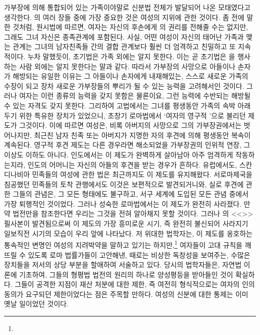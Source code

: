 가부장에 의해 통합되어 있는 가족이야말로
신분법 전체가 발달되어 나온 모태였다고 생각한다.
의 여러 장들 중에
가장 중요한 것은 여성의 지위에 관한 것이다.
좀 전에 말한 것처럼,
원시법에 따르면,
여자는 자신의 후손에게 의 권리를 전해줄 수는 없지만,
그래도 그녀 자신은 종족관계에 포함된다.
사실, 어떤 여성이 자신의 태어난 가족과 맺는 관계는
그녀의 남자친족들 간의 결합 관계보다
훨씬 더 엄격하고 친밀하고 또 지속적이다.
누차 말했듯이,
초기법은 가족 외에는 알지 못한다.
이는 곧 초기법은 을 행사하는 사람 외에는 알지 못한다는 말과 같다.
따라서 가부장의 사망으로 아들이나 손자가 해방되는 유일한 이유는
그 아들이나 손자에게 내재해있는,
스스로 새로운 가족의 수장이 되고
장차 새로운 가부장들의 뿌리가 될 수 있는
능력을 고려해서인 것이다.
그러나 여자는 이런 종류의 능력을 갖지 못함은 물론이요,
그런 능력에 수반되는 해방될 수 있는 자격도 갖지 못한다.
그리하여 고법에서는
그녀를 평생동안 가족의 속박 아래 두기 위한 특유한 장치가 있었으니,
초창기 로마법에서
`여자의 영구적 '으로 불리던 제도가 그것이다.
이에 따르면 여성은,
비록 아버지의 사망으로 그의 가부장권에서는 벗어나지만,
최근친 남자 친족 또는 아버지가 지명한 자의 후견에 의해
평생동안
복속이
계속된다.
영구적 후견 제도는
다른 경우라면 해소되었을
가부장권의 인위적 연장, 그 이상도 이하도 아니다.
인도에서는 이 제도가 완벽하게 살아남아
아주 엄격하게 작동하는지라, 인도의 어머니는
자신의 아들의 후견을 받는 경우가 흔하다.
유럽에서도,
스칸디나비아 민족들의
여성에 관한
법은 최근까지도 이 제도를 유지해왔다.
서로마제국을 침공했던 민족들의 토착 관행에서도 이것은 보편적으로
발견되거니와, 실로 후견에 관한 그들의 관념은, 그 모든 형태에도 불구하고,
서구 세계에 도입된 모든 관념 중에서 가장 퇴행적인 것이었다.
그러나 성숙한 로마법에서는 이 제도가 완전히 사라졌다.
만약  법전만을 참조한다면
우리는 그것을 전혀 알아채지 못할 것이다.
그러나 의 <<>> 필사본이 발견됨으로써
이 제도의 가장 흥미로운 시기,
즉 완전히 불신되어 사라지기 일보직전 시기의
모습이 우리 앞에 나타났다.
저 위대한 법학자는,
이 제도를 옹호하는 통속적인 변명인
여성의 지려박약을 말하고 있기는 하지만,\footnote{%
  }
여자들이
고대 규칙을 깨뜨릴 수 있도록
로마 법률가들이 고안해낸, 때로는 비상한 독창성을 보여주는,
수많은 장치들을
저서의 상당 부분을 할애하여
서술하고 있다.
당시의 법학자들은,
자연법 이론에 기초하여,
그들의 형평법 법전의 원리의 하나로
양성평등을
받아들인 것이 확실하다.
그들이 공격한 지점이 재산 처분에 대한 제한,
즉 여전히 형식적으로는 여자의 인의 동의가 요구되던
제한이었다는 점은 주목할 만하다.
여성의 신분에 대한 통제는 이미 옛날 일이었던 것이다.

